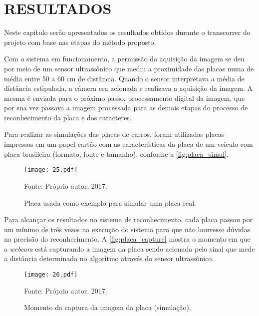 \chapter{\textbf{\uppercase{Resultados}}}\label{cap_5}

Neste capítulo serão apresentados os resultados obtidos durante o transcorrer do projeto com base nas etapas do método proposto. 

Com o sistema em funcionamento, a permissão da aquisição da imagem se deu por meio de um sensor ultrassônico que mediu a proximidade das placas numa de média entre 50 a 60 cm de distância. Quando o sensor interpretava a média de distância estipulada, a câmera era acionada e realizava a aquisição da imagem. A mesma é enviada para o próximo passo, processamento digital da imagem, que por sua vez passava a imagem processada para as demais etapas do processo de reconhecimento da placa e dos caracteres.

Para realizar as simulações das placas de carros, foram utilizadas placas impressas em um papel cartão com as características da placa de um veiculo com placa brasileira (formato, fonte e tamanho), conforme a \autoref{fig:placa_simul}.

\begin{figure}[htb]
	\centering
	\caption{{\footnotesize Placa usada como exemplo para simular uma placa real.}}   %
	\label{fig:placa_simul}
	\texttt{[image: 25.pdf]}
	
	{\footnotesize Fonte: Próprio autor, 2017.}
\end{figure}

Para alcançar os resultados no sistema de reconhecimento, cada placa passou por um mínimo de três vezes na execução do sistema para que não houvesse dúvidas na precisão do reconhecimento. A \autoref{fig:placa_capture} mostra o momento em que a \textit{webcam} está capturando a imagem da placa sendo acionada pelo sinal que mede a distância determinada no algoritmo através do sensor ultrassônico.

\begin{figure}[htb]
	\centering
	\caption{{\footnotesize Momento da captura da imagem da placa (simulação).}}   %
	\label{fig:placa_capture}
	\texttt{[image: 26.pdf]}
	
	{\footnotesize Fonte: Próprio autor, 2017.}
\end{figure}

